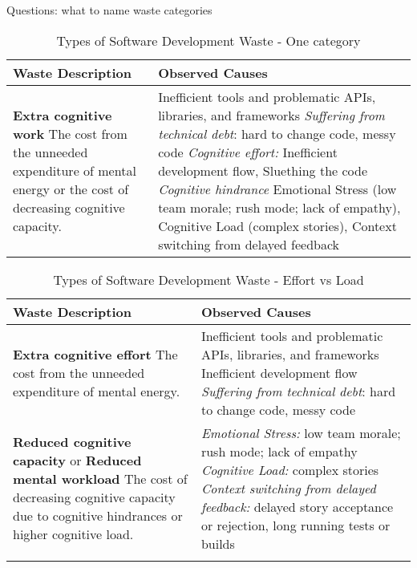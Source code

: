 Questions: what to name waste categories


\begin{table*}[htbp]
\renewcommand{\arraystretch}{1.3}
\centering
\caption{Types of Software Development Waste - One category}
\label{Waste}
\begin{tabular}{|p{2.5in}|p{3.6in}|} %
\hline
\textbf{Waste} \newline Description  & Observed Causes 
\\ \hline
\textbf{Extra cognitive work} \newline   
The cost from the unneeded expenditure of mental energy or the cost of decreasing cognitive capacity. & 
Inefficient tools and problematic APIs, libraries, and frameworks  \newline
\textit{Suffering from technical debt}: hard to change code, messy code \newline
\textit{Cognitive effort:} Inefficient development flow, Sluething the code \newline
\textit{Cognitive hindrance} Emotional Stress (low team morale; rush mode; lack of empathy), Cognitive Load (complex stories), Context switching from delayed feedback
\\ \hline
\end{tabular} 
\end{table*}


\begin{table*}[htbp]
\renewcommand{\arraystretch}{1.3}
\centering
\caption{Types of Software Development Waste - Effort vs Load}
\label{Waste}
\begin{tabular}{|p{2.5in}|p{3.6in}|} %
\hline
\textbf{Waste} \newline Description  & Observed Causes 
\\ \hline
\textbf{Extra cognitive effort} \newline   
The cost from the unneeded expenditure of mental energy. & 
Inefficient tools and problematic APIs, libraries, and frameworks  \newline Inefficient development flow \newline
\textit{Suffering from technical debt}: hard to change code, messy code
\\ \hline
\textbf{Reduced cognitive capacity} or \newline 
\textbf{Reduced mental workload} \newline 
The cost of decreasing cognitive capacity due to cognitive hindrances or higher cognitive load.  & 
\textit{Emotional Stress:} low team morale; rush mode; lack of empathy \newline \textit{Cognitive Load:} complex stories \newline
\textit{Context switching from delayed feedback:} delayed story acceptance or rejection, long running tests or builds  \\ \hline
 \\ \hline
\end{tabular} 
\end{table*}



